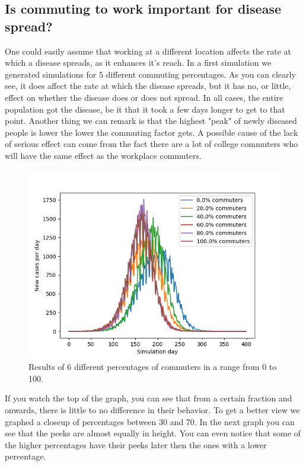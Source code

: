 \documentclass[runningheads]{llncs}
\begin{document}
\subsection{Is commuting to work important for disease spread?}
One could easily assume that working at a different location affects the rate at which a disease spreads, as it enhances it's reach. In a first simulation we generated simulations for 5 different commuting percentages. As you can clearly see, it does affect the rate at which the disease spreads, but it has no, or little, effect on whether the disease does or does not spread. In all cases, the entire population got the disease, be it that it took a few days longer to get to that point. Another thing we can remark is that the highest "peak" of newly diseased people is lower the lower the commuting factor gets. A possible cause of the lack of serious effect can come from the fact there are a lot of college commuters who will have the same effect as the workplace commuters. 
\begin{figure}
	\includegraphics[width=\textwidth]{test_0-100.png}
	\caption{Results of 6 different percentages of commuters in a range from 0 to 100.}
\end{figure}
\newpage
If you watch the top of the graph, you can see that from a certain fraction and onwards, there is little to no difference in their behavior. To get a better view we graphed a closeup of percentages between 30 and 70. In the next graph you can see that the peeks are almost equally in height. You can even notice that some of the higher percentages have their peeks later then the ones with a lower percentage. 
\end{document}

